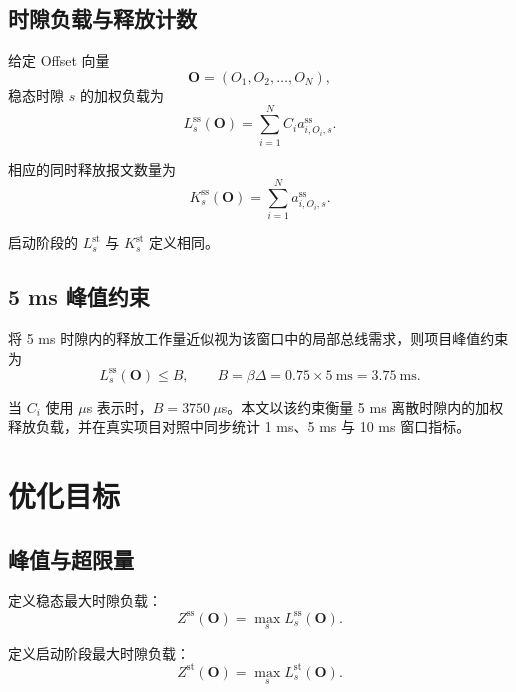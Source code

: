 \documentclass[UTF8,12pt,a4paper]{ctexart}
\begin{document}
\subsection{时隙负载与释放计数}

给定 Offset 向量
\begin{equation}
 \symbf{O}=(O_1,O_2,\ldots,O_N),
\end{equation}
稳态时隙 $s$ 的加权负载为
\begin{equation}
 L^{\mathrm{ss}}_s(\symbf{O})=
 \sum_{i=1}^{N} C_i a^{\mathrm{ss}}_{i,O_i,s}.
\label{eq:slot-load}
\end{equation}

相应的同时释放报文数量为
\begin{equation}
 K^{\mathrm{ss}}_s(\symbf{O})=
 \sum_{i=1}^{N} a^{\mathrm{ss}}_{i,O_i,s}.
\label{eq:slot-count}
\end{equation}

启动阶段的 $L^{\mathrm{st}}_s$ 与 $K^{\mathrm{st}}_s$ 定义相同。

\subsection{5 ms 峰值约束}

将 5 ms 时隙内的释放工作量近似视为该窗口中的局部总线需求，则项目峰值约束为
\begin{equation}
 L^{\mathrm{ss}}_s(\symbf{O})\le B,
 \qquad B=\beta\Delta=0.75\times 5\ \mathrm{ms}=3.75\ \mathrm{ms}.
\label{eq:hard-constraint}
\end{equation}

当 $C_i$ 使用 $\mu$s 表示时，$B=3750\ \mu$s。本文以该约束衡量 5 ms 离散时隙内的加权释放负载，并在真实项目对照中同步统计 1 ms、5 ms 与 10 ms 窗口指标。

\section{优化目标}

\subsection{峰值与超限量}

定义稳态最大时隙负载：
\begin{equation}
 Z^{\mathrm{ss}}(\symbf{O})=\max_s L^{\mathrm{ss}}_s(\symbf{O}).
\label{eq:zss}
\end{equation}

定义启动阶段最大时隙负载：
\begin{equation}
 Z^{\mathrm{st}}(\symbf{O})=\max_s L^{\mathrm{st}}_s(\symbf{O}).
\label{eq:zst}
\end{equation}
\end{document}
